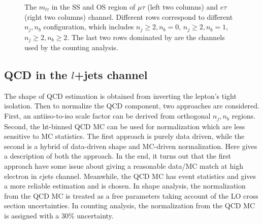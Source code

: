 \begin{figure}
    
    
    
    
    

    \caption{The $m_{l\tau}$ in the SS and OS region of $\mu\tau$ (left two columns) and $e\tau$ (right two columns) 
    channel. Different rows correspond to different $n_j,n_b$ configuration, which includes
    $n_j\geq 2,n_b=0$, $n_j\geq 2,n_b=1$, $n_j\geq 2,n_b\geq 2$. The last two rows dominated by \ttbar are the channels used by the counting analysis.
    }
    \label{fig:appendix:qcdsf:ltau2}
\end{figure}



\subsection{QCD in the $l$+jets channel} 

The shape of QCD estimation is obtained from inverting the lepton's tight isolation. Then to normalize the QCD component, two approaches are considered. First, an antiiso-to-iso 
scale factor can be derived from orthogonal $n_j,n_b$ regions. Second, the ht-binned QCD MC can be used for normalization which are less sensitive to MC statistics. The first approach is purely data driven, while the second is a hybrid of data-driven shape and MC-driven normalization. Here gives a description of both the approach. In the end, it turns out that the first approach have some issue about giving a reasonable data/MC match at high electron \pt in $e$jets channel. Meanwhile, the QCD MC has event statistics and gives a more reliable estimation and is chosen. In shape analysis, the normalization from the QCD MC is treated as a free parameters taking account of the LO cross section uncertainties.
In counting analysis, the normalization from the QCD MC is assigned with a 30\% uncertainty.

